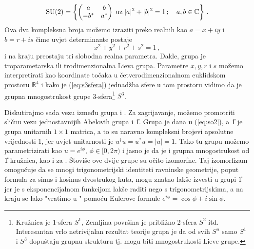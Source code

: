 \begin{equation}
    \mathrm{SU}(2) = \left\{
        \begin{pmatrix}
            a & b \\ -b^* & a^*
    \end{pmatrix} \; \text{uz}\;   |a|^2 + |b|^2 = 1\,;\quad  a,b \in\mathbb{C} \right\} \,.
    \label{eq:su2ab}
\end{equation}
Ova dva kompleksna broja možemo izraziti preko realnih kao $a = x + iy$ i
$b = r + is$ čime uvjet determinante postaje
\begin{equation}
    x^2 + y^2 +r^2 +s^2 = 1 \,,
    \label{eq:s3sfera}
\end{equation}
i na kraju preostaju tri slobodna realna parametra. Dakle, grupa  je troparametarska
ili trodimenzionalna Lieva grupa. Parametre $x, y, r$ i $s$ možemo interpretirati
kao koordinate točaka u četverodimenzionalnom euklidskom prostoru $\mathbb{R}^4$
i kako je (\ref{eq:s3sfera}) jednadžba sfere u tom prostoru vidimo da je
grupna mnogostrukost grupe  3-sfera\footnote{Kružnica je 1-sfera $S^1$,
    Zemljina površina je približno 2-sfera $S^2$ itd. Interesantan vrlo
    netrivijalan rezultat teorije grupa je da od svih $S^n$ samo $S^1$ i $S^3$ dopuštaju
grupnu strukturu tj. mogu biti mnogostrukosti Lieve grupe.} $S^3$.


Diskutirajmo sada vezu između grupa  i . Za zagrijavanje, možemo
promotriti sličnu vezu jednostavnijih Abelovih grupa  i \U{1}. Grupa  je dana
u (\ref{eq:so2}), a \U{1} je grupa unitarnih $1 \times 1$
matrica, a to su naravno kompleksni brojevi apsolutne vrijednosti 1, jer uvjet
unitarnosti je $u^\dagger u = u^* u = |u| = 1$. Tako tu grupu možemo
parametrizirati kao $u = e^{i\phi}$, $\phi\in [0, 2\pi)$ i jasno je da je
i grupna mnogostrukost od \U{1} kružnica, kao i za . Štoviše ove dvije
grupe su očito izomorfne. Taj izomorfizam omogućuje da se mnogi
trigonometrijski identiteti ravninske geometrije, poput formula za sinus i kosinus dvostrukog kuta,
mogu znatno lakše izvesti u grupi \U{1} jer je s eksponencijalnom
funkcijom lakše raditi nego s trigonometrijskima, a na kraju se lako "vratimo
u " pomoću Eulerove formule $e^{i\phi} = \cos\phi + i\sin\phi$.

